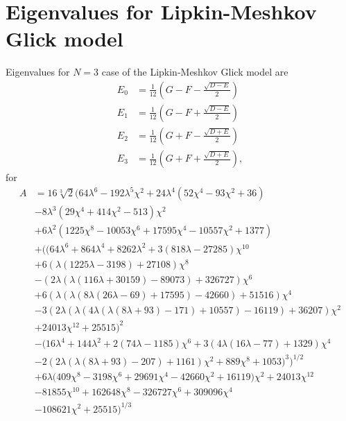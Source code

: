 \chapter{Eigenvalues for Lipkin-Meshkov Glick model}
\label{appendix1}
Eigenvalues for $N=3$ case of the Lipkin-Meshkov Glick model are
\begin{align}
    E_0 &= \frac{1}{12} \left(G-F-\frac{\sqrt{D-E}}{2}\right)\\
    E_1 &= \frac{1}{12}  \left(G-F+\frac{\sqrt{D-E}}{2}\right)\\
    E_2 &= \frac{1}{12} \left(G+F-\frac{\sqrt{D+E}}{2}\right)\\
    E_3 &= \frac{1}{12}  \left(G+F+\frac{\sqrt{D+E}}{2}\right),
\end{align}
for
\begin{equation}
    \begin{split}
    A &= 16 \sqrt[3]{2} \Big(64 \lambda ^6-192 \lambda ^5 \chi ^2+24 \lambda ^4 \left(52 \chi ^4-93 \chi ^2+36\right)\\
    &-8 \lambda ^3 \left(29 \chi ^4+414 \chi ^2-513\right) \chi ^2
    \\
    &+6 \lambda ^2 \left(1225 \chi ^8-10053 \chi ^6+17595 \chi ^4-10557 \chi ^2+1377\right)\\
    &+\bigg(\big(64 \lambda ^6+864 \lambda ^4+8262 \lambda ^2+3 (818 \lambda -27285) \chi ^{10}\\
    &+6 (\lambda  (1225 \lambda -3198)+27108) \chi ^8\\
    &-(2 \lambda  (\lambda  (116 \lambda +30159)-89073)+326727) \chi ^6\\
    &+6 (\lambda  (\lambda  (8 \lambda  (26 \lambda -69)+17595)-42660)+51516) \chi ^4\\
    &-3 (2 \lambda  (\lambda  (4 \lambda  (\lambda  (8 \lambda +93)-171)+10557)-16119)+36207) \chi ^2\\
    &+24013 \chi ^{12}+25515\big)^2\\
    &-\big(16 \lambda ^4+144 \lambda ^2+2 (74 \lambda -1185) \chi ^6+3 (4 \lambda  (16 \lambda -77)+1329) \chi ^4\\
    &-2 (2 \lambda  (\lambda  (8 \lambda +93)-207)+1161) \chi ^2+889 \chi ^8+1053\big)^3\bigg)^{1/2}\\
    &+6 \lambda  \big(409 \chi ^8-3198 \chi ^6+29691 \chi ^4-42660 \chi ^2+16119\big) \chi ^2+24013 \chi ^{12}\\
    &-81855 \chi ^{10}+162648 \chi ^8-326727 \chi ^6+309096 \chi ^4\\
    &-108621 \chi ^2+25515\Big)^{1/3}
    \end{split}
\end{equation}

